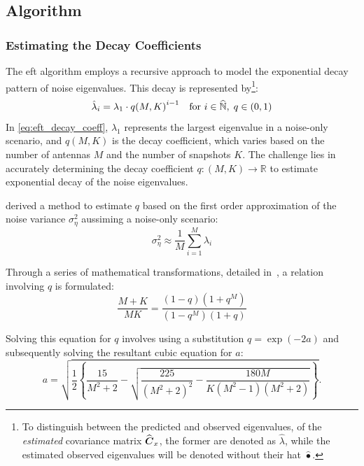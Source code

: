 \subsection{Algorithm}
\subsubsection*{Estimating the Decay Coefficients}

The \gls{eft} algorithm employs a recursive approach to model the exponential decay pattern of noise eigenvalues.
This decay is represented by\footnote{To distinguish between the predicted and observed eigenvalues, of the
\textit{estimated} covariance matrix \( \widehat{\boldsymbol{C}}_x \), the former are denoted as \( \hat{\lambda} \), while the estimated
observed eigenvalues will be denoted without their hat \( \widehat{\bullet} \).}:
\begin{equation}
    \hat{\lambda}_i = \lambda_1 \cdot {q(M, K)}^{i-1} \quad \text{for } i \in \widehat{\mathbb{N}}, \; q \in (0, 1)
    \label{eq:eft_decay_coeff}
\end{equation}
In \autoref{eq:eft_decay_coeff}, \( \lambda_1 \) represents the largest eigenvalue in a noise-only scenario, and \( q(M, K) \) is the decay
coefficient, which varies based on the number of antennas \( M \) and the number of snapshots \( K \).
The challenge lies in accurately determining the decay coefficient \( q : (M, K) \rightarrow \mathbb{R} \) to estimate
exponential decay of the noise eigenvalues.

\cite{eft} derived a method to estimate \( q \) based on the first order approximation of the noise variance \( \sigma^2_{\eta} \)
aussiming a noise-only scenario:
\begin{equation}
    \sigma^2_{\eta} \approx \frac{1}{M} \sum_{i=1}^{M} \lambda_i
    \label{eq:eft_noise_variance}
\end{equation}

Through a series of mathematical transformations, detailed in~\cite{eft}, a relation involving \( q \) is formulated:
\begin{equation}
    \frac{M+K}{M K} = \frac{(1-q)\left(1+q^M\right)}{\left(1-q^M\right)(1+q)}
\end{equation}

Solving this equation for \( q \) involves using a substitution \( q = \exp(-2a) \) and subsequently solving the
resultant cubic equation for \( a \):
\begin{equation}
    a=\sqrt{\frac{1}{2}\left\{\frac{15}{M^2+2}-\sqrt{\frac{225}{\left(M^2+2\right)^2}-\frac{180 M}{K\left(M^2-1\right)\left(M^2+2\right)}}\right\}} .
    \label{eq:eft_decay_coefficient}
\end{equation}


